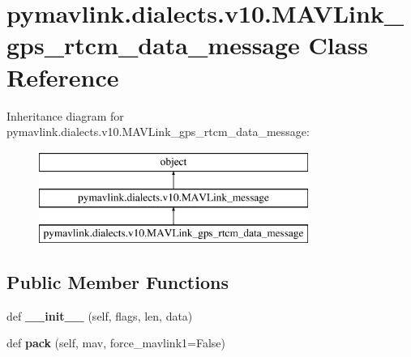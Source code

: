 \hypertarget{classpymavlink_1_1dialects_1_1v10_1_1MAVLink__gps__rtcm__data__message}{}\section{pymavlink.\+dialects.\+v10.\+M\+A\+V\+Link\+\_\+gps\+\_\+rtcm\+\_\+data\+\_\+message Class Reference}
\label{classpymavlink_1_1dialects_1_1v10_1_1MAVLink__gps__rtcm__data__message}
Inheritance diagram for pymavlink.\+dialects.\+v10.\+M\+A\+V\+Link\+\_\+gps\+\_\+rtcm\+\_\+data\+\_\+message\+:\begin{figure}[H]
\begin{center}
\leavevmode
\includegraphics[height=3.000000cm]{classpymavlink_1_1dialects_1_1v10_1_1MAVLink__gps__rtcm__data__message}
\end{center}
\end{figure}
\subsection*{Public Member Functions}
\begin{DoxyCompactItemize}
\item 
\mbox{\label{classpymavlink_1_1dialects_1_1v10_1_1MAVLink__gps__rtcm__data__message_a3c3f3db5e0d0ad2c0f12f7dbf3d1f1d1}} 
def {\bfseries \+\_\+\+\_\+init\+\_\+\+\_\+} (self, flags, len, data)
\item 
\mbox{\label{classpymavlink_1_1dialects_1_1v10_1_1MAVLink__gps__rtcm__data__message_ac6d84e6705b54045e7098ddd6b224008}} 
def {\bfseries pack} (self, mav, force\+\_\+mavlink1=False)
\end{DoxyCompactItemize}
